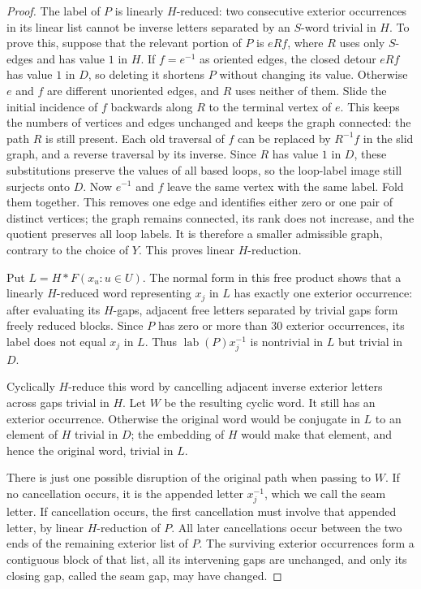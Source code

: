 \begin{proof}
The label of $P$ is linearly $H$-reduced: two consecutive exterior
occurrences in its linear list cannot be inverse letters separated by
an $S$-word trivial in $H$.  To prove this, suppose that the relevant
portion of $P$ is $eRf$, where $R$ uses only $S$-edges and has value
$1$ in $H$.  If $f=e^{-1}$ as oriented edges, the closed detour $eRf$
has value $1$ in $D$, so deleting it shortens $P$ without changing its
value.  Otherwise $e$ and $f$ are different unoriented edges, and $R$
uses neither of them.  Slide the initial incidence of $f$ backwards
along $R$ to the terminal vertex of $e$.  This keeps the numbers of
vertices and edges unchanged and keeps the graph connected: the path
$R$ is still present.  Each old traversal of $f$ can be replaced by
$R^{-1}f$ in the slid graph, and a reverse traversal by its inverse.
Since $R$ has value $1$ in $D$, these substitutions preserve the values
of all based loops, so the loop-label image still surjects onto $D$.
Now $e^{-1}$ and $f$ leave the same vertex with the same label.  Fold
them together.  This removes one edge and identifies either zero or
one pair of distinct vertices; the graph remains connected, its rank
does not increase, and the quotient preserves all loop labels.
It is therefore a smaller admissible graph, contrary to the choice of
$Y$.  This proves linear $H$-reduction.

Put $L=H*F(x_u:u\in U)$.  The normal form in this free product shows
that a linearly $H$-reduced word representing $x_j$ in $L$ has exactly
one exterior occurrence: after evaluating its $H$-gaps, adjacent free
letters separated by trivial gaps form freely reduced blocks.
Since $P$ has zero or more than $30$ exterior occurrences, its label
does not equal $x_j$ in $L$.
Thus $\operatorname{lab}(P)x_j^{-1}$ is nontrivial in $L$ but trivial
in $D$.

Cyclically $H$-reduce this word by cancelling adjacent inverse exterior
letters across gaps trivial in $H$.  Let $W$ be the resulting cyclic
word.  It still has an exterior occurrence.  Otherwise the original
word would be conjugate in $L$ to an element of $H$ trivial in $D$;
the embedding of $H$ would make that element, and hence the original
word, trivial in $L$.

There is just one possible disruption of the original path when
passing to $W$.  If no cancellation occurs, it is the appended letter
$x_j^{-1}$, which we call the seam letter.  If cancellation occurs,
the first cancellation must involve that appended letter, by linear
$H$-reduction of $P$.  All later cancellations occur between the two
ends of the remaining exterior list of $P$.  The surviving exterior
occurrences form a contiguous block of that list, all its intervening
gaps are unchanged, and only its closing gap, called the seam gap,
may have changed.


\end{proof}
